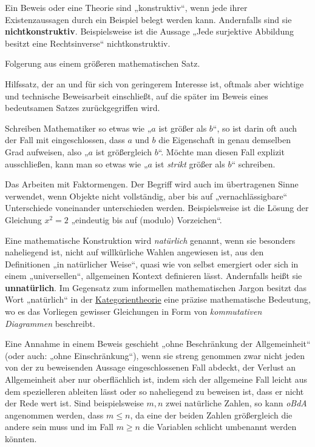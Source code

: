 \begin{description}[labelindent=0pt, leftmargin=0pt]
    \item[Konstruktiv:] Ein Beweis oder eine Theorie sind „konstruktiv“, wenn jede ihrer Existenzaussagen durch ein Beispiel belegt werden kann. Andernfalls sind sie \textbf{nichtkonstruktiv}. Beispielsweise ist die Aussage „Jede surjektive Abbildung besitzt eine Rechtsinverse“ nichtkonstruktiv.
    
    \item[Korollar:] Folgerung aus einem größeren mathematischen Satz.

    \item[Lemma:] Hilfssatz, der an und für sich von geringerem Interesse ist, oftmals aber wichtige und technische Beweisarbeit einschließt, auf die später im Beweis eines bedeutsamen Satzes zurückgegriffen wird.

    \item[Mathematischer Komparativ:] Schreiben Mathematiker so etwas wie „$a$ ist größer als $b$“, so ist darin oft auch der Fall mit eingeschlossen, dass $a$ und $b$ die Eigenschaft in genau demselben Grad aufweisen, also „$a$ ist größergleich $b$“. Möchte man diesen Fall explizit ausschließen, kann man so etwas wie „$a$ ist \emph{strikt} größer als $b$“ schreiben.
    
    \item[Modulo:]  Das Arbeiten mit Faktormengen. Der Begriff wird auch im übertragenen Sinne verwendet, wenn Objekte nicht vollständig, aber bis auf „vernachlässigbare“ Unterschiede voneinander unterschieden werden. Beispielsweise ist die Lösung der Gleichung $x^2=2$ „eindeutig bis auf (\glq modulo\grq) Vorzeichen“.

    \item[Natürlich:] Eine mathematische Konstruktion wird \emph{natürlich} genannt, wenn sie besonders naheliegend ist, nicht auf willkürliche Wahlen angewiesen ist, aus den Definitionen „in natürlicher Weise“, quasi wie von selbst emergiert oder sich in einem „universellen“, allgemeinen Kontext definieren lässt. Andernfalls heißt sie \textbf{unnatürlich}. Im Gegensatz zum informellen mathematischen Jargon besitzt das Wort „natürlich“ in der \href{https://ncatlab.org/nlab/show/category+theory}{Kategorientheorie} eine präzise mathematische Bedeutung, wo es das Vorliegen gewisser Gleichungen in Form von \emph{kommutativen Diagrammen} beschreibt.

    \item[Ohne Beschränkung der Allgemeinheit (OBdA):]  Eine Annahme in einem Beweis geschieht „ohne Beschränkung der Allgemeinheit“ (oder auch: „ohne Einschränkung“), wenn sie streng genommen zwar nicht jeden von der zu beweisenden Aussage eingeschlossenen Fall abdeckt, der Verlust an Allgemeinheit aber nur oberflächlich ist, indem sich der allgemeine Fall leicht aus dem spezielleren ableiten lässt oder so naheliegend zu beweisen ist, dass er nicht der Rede wert ist. Sind beispielsweise $m,n$ zwei natürliche Zahlen, so kann \emph{oBdA} angenommen werden, dass $m\le n$, da eine der beiden Zahlen größergleich die andere sein muss und im Fall $m\ge n$ die Variablen schlicht umbenannt werden könnten.


\end{description}
